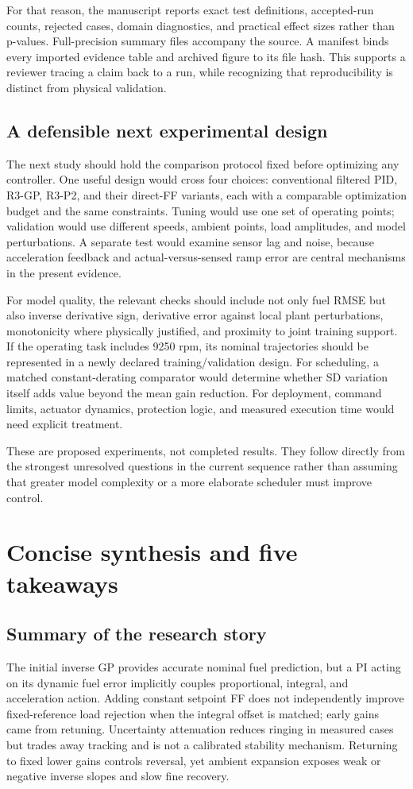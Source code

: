 \documentclass[11pt,a4paper,oneside]{report}
\begin{document}
For that reason, the manuscript reports exact test definitions, accepted-run counts, rejected cases, domain diagnostics, and practical effect sizes rather than p-values. Full-precision summary files accompany the source. A manifest binds every imported evidence table and archived figure to its file hash. This supports a reviewer tracing a claim back to a run, while recognizing that reproducibility is distinct from physical validation.

\section{A defensible next experimental design}
The next study should hold the comparison protocol fixed before optimizing any controller. One useful design would cross four choices: conventional filtered PID, R3-GP, R3-P2, and their direct-FF variants, each with a comparable optimization budget and the same constraints. Tuning would use one set of operating points; validation would use different speeds, ambient points, load amplitudes, and model perturbations. A separate test would examine sensor lag and noise, because acceleration feedback and actual-versus-sensed ramp error are central mechanisms in the present evidence.

For model quality, the relevant checks should include not only fuel RMSE but also inverse derivative sign, derivative error against local plant perturbations, monotonicity where physically justified, and proximity to joint training support. If the operating task includes 9250 rpm, its nominal trajectories should be represented in a newly declared training/validation design. For scheduling, a matched constant-derating comparator would determine whether SD variation itself adds value beyond the mean gain reduction. For deployment, command limits, actuator dynamics, protection logic, and measured execution time would need explicit treatment.

These are proposed experiments, not completed results. They follow directly from the strongest unresolved questions in the current sequence rather than assuming that greater model complexity or a more elaborate scheduler must improve control.

\chapter{Concise synthesis and five takeaways}
\section{Summary of the research story}
The initial inverse GP provides accurate nominal fuel prediction, but a PI acting on its dynamic fuel error implicitly couples proportional, integral, and acceleration action. Adding constant setpoint FF does not independently improve fixed-reference load rejection when the integral offset is matched; early gains came from retuning. Uncertainty attenuation reduces ringing in measured cases but trades away tracking and is not a calibrated stability mechanism. Returning to fixed lower gains controls reversal, yet ambient expansion exposes weak or negative inverse slopes and slow fine recovery.
\end{document}

